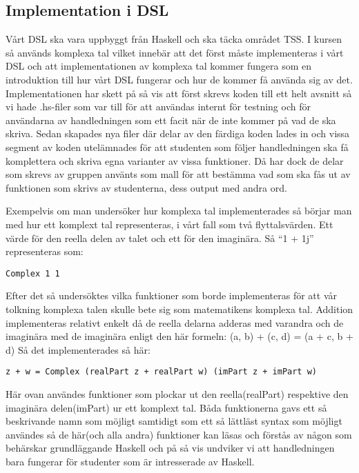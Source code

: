 \documentclass[]{article}
\begin{document}
\subsection{Implementation i DSL}
Vårt DSL ska vara uppbyggt från Haskell och ska täcka området TSS.
I kursen så används komplexa tal vilket innebär att det först måste implementeras i vårt DSL och att implementationen av komplexa tal kommer fungera som en introduktion till hur vårt DSL fungerar och hur de kommer få använda sig av det. 
Implementationen har skett på så vis att först skrevs koden till ett helt avsnitt så vi hade .hs-filer som var till för att användas internt för testning och för användarna av handledningen som ett facit när de inte kommer på vad de ska skriva. Sedan skapades nya filer där delar av den färdiga koden lades in och vissa segment av koden utelämnades för att studenten som följer handledningen ska få komplettera och skriva egna varianter av vissa funktioner. Då har dock de delar som skrevs av gruppen använts som mall för att bestämma vad som ska fås ut av funktionen som skrivs av studenterna, dess output med andra ord. 

Exempelvis om man undersöker hur komplexa tal implementerades så börjar man med hur ett komplext tal representeras, i vårt fall som två flyttalsvärden. Ett värde för den reella delen av talet och ett för den imaginära. Så “1 + 1j” representeras som:

\begin{verbatim}
Complex 1 1 
\end{verbatim}

Efter det så undersöktes vilka funktioner som borde implementeras för att vår tolkning komplexa talen skulle bete sig som matematikens komplexa tal. 
Addition implementeras relativt enkelt då de reella delarna adderas med varandra och de imaginära med de imaginära enligt den här formeln: 
(a, b) + (c, d) = (a + c, b + d)
Så det implementerades så här: 
\begin{verbatim}
z + w = Complex (realPart z + realPart w) (imPart z + imPart w)
\end{verbatim}

Här ovan användes funktioner som plockar ut den reella(realPart) respektive den imaginära delen(imPart) ur ett komplext tal. 
Båda funktionerna gavs ett så beskrivande namn som möjligt samtidigt som ett så lättläst syntax som möjligt användes så de här(och alla andra) funktioner kan läsas och förstås av någon som behärskar grundläggande Haskell och på så vis undviker vi att handledningen bara fungerar för studenter som är intresserade av Haskell. 
\end{document}
